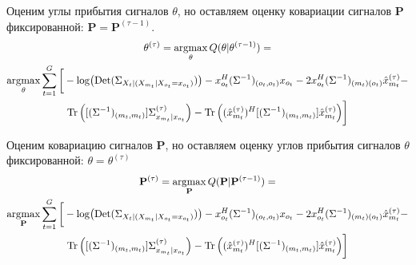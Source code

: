 \documentclass[11pt]{article}
\DeclareMathOperator*{\argmax}{argmax}
\DeclareMathOperator{\Det}{Det}
\begin{document}
\begin{center}
\fontsize{14}{18}\selectfont {}
\end{center}
Оценим углы прибытия сигналов $\theta$, но оставляем оценку ковариации сигналов $\mathbf{P}$ фиксированной: $\mathbf{P} = \mathbf{P}^{(\tau-1)}$.
\begin{equation*}
\begin{gathered}
\theta^{(\tau)}= \argmax_{\theta} Q(\theta | \theta^{(\tau-1)}) = \\
\argmax_{\theta} \sum_{t=1}^G \bigg[ - \log (\Det(\Sigma_{X_t|(X_{m_t}|X_{o_t}=x_{o_t})})) - x_{o_t}^H (\Sigma^{-1})_{(o_t, o_t)}x_{o_t} - 2 x_{o_t}^H (\Sigma^{-1})_{(m_t)(o_t)}\hat{x}_{m_t}^{(\tau)} - \\ \Tr \Big( [(\Sigma^{-1})_{(m_t, m_t)}]\Sigma^{(\tau)}_{x_{m_t}|x_{o_t}} \Big) - \Tr \Big((\hat{x}_{m_t}^{(\tau)})^H[(\Sigma^{-1})_{(m_t, m_t)}]\hat{x}_{m_t}^{(\tau)} \Big) \bigg]
\end{gathered}
\end{equation*}
\begin{center}
\fontsize{14}{18}\selectfont {}
\end{center}
Оценим ковариацию сигналов $\mathbf{P}$, но оставляем оценку углов прибытия сигналов $\theta$ фиксированной: $\theta = \theta^{(\tau)}$
\begin{equation*}
\begin{gathered}
\mathbf{P}^{(\tau)}= \argmax_{\mathbf{P}} Q(\mathbf{P} | \mathbf{P}^{(\tau-1)}) = \\
\argmax_{\mathbf{P}} \sum_{t=1}^G \bigg[ - \log (\Det(\Sigma_{X_t|(X_{m_t}|X_{o_t}=x_{o_t})})) - x_{o_t}^H (\Sigma^{-1})_{(o_t, o_t)}x_{o_t} - 2 x_{o_t}^H (\Sigma^{-1})_{(m_t)(o_t)}\hat{x}_{m_t}^{(\tau)} - \\ \Tr \Big( [(\Sigma^{-1})_{(m_t, m_t)}]\Sigma^{(\tau)}_{x_{m_t}|x_{o_t}} \Big) - \Tr \Big((\hat{x}_{m_t}^{(\tau)})^H[(\Sigma^{-1})_{(m_t, m_t)}]\hat{x}_{m_t}^{(\tau)} \Big) \bigg]
\end{gathered}
\end{equation*}
\begin{center}
\fontsize{16}{20}\selectfont {}
\end{center}
\begin{center}
\fontsize{14}{18}\selectfont {}
\end{center}
\begin{center}
\fontsize{14}{18}\selectfont {}
\end{center}
\begin{center}
\fontsize{14}{18}\selectfont {}
\end{center}
\begin{center}
\fontsize{14}{18}\selectfont {}
\end{center}
\begin{center}
\fontsize{16}{20}\selectfont {}
\end{center}
\end{document}
